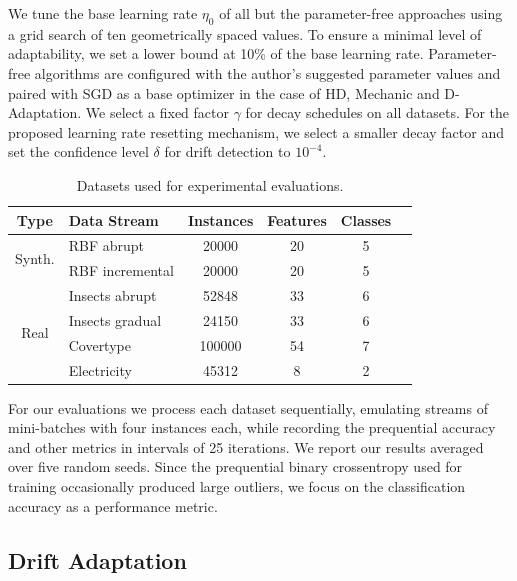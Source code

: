 \documentclass[runningheads]{llncs}
\begin{document}
We tune the base learning rate $\eta_0$ of all but the parameter-free approaches using a grid search of ten geometrically spaced values.
To ensure a minimal level of adaptability, we set a lower bound at 10\% of the base learning rate.
Parameter-free algorithms are configured with the author's suggested parameter values and paired with SGD as a base optimizer in the case of HD, Mechanic and D-Adaptation.
We select a fixed factor $\gamma$ for decay schedules on all datasets.
For the proposed learning rate resetting mechanism, we select a smaller decay factor and set the confidence level $\delta$ for drift detection to $10^{-4}$.
\begin{table}[t]
	\centering
	\scriptsize
	\begin{tabular}{@{}clcccc@{}}
		\toprule
		Type                    & Data Stream               & Instances & Features & Classes \\
		\midrule
		\multirow{2}{*}{Synth.} & RBF abrupt                & 20000     & 20       & 5       \\
		                        & RBF incremental           & 20000     & 20       & 5       \\
		\midrule
		\multirow{5}{*}{Real}   & Insects abrupt            & 52848     & 33       & 6       \\
		                        & Insects gradual           & 24150     & 33       & 6       \\
		                        & Covertype\footnotemark[3] & 100000    & 54       & 7       \\
		                        & Electricity               & 45312     & 8        & 2       \\
		\bottomrule
	\end{tabular}
	\caption{Datasets used for experimental evaluations.}
	\label{tab:datasets}
\end{table}
For our evaluations we process each dataset sequentially, emulating streams of mini-batches with four instances each, while recording the prequential accuracy and other metrics in intervals of 25 iterations.
We report our results averaged over five random seeds.
Since the prequential binary crossentropy used for training occasionally produced large outliers, we focus on the classification accuracy as a performance metric.

\subsection{Drift Adaptation}
\end{document}
